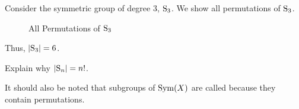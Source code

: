 \begin{example}\label{example-symmetric-group-of-degree-3}
    Consider the symmetric group of degree 3, $\mathrm{S}_{3}$. We show all permutations of $\mathrm{S}_{3}$.

    \begin{figure}[h]
        \centering
        \caption{All Permutations of $\mathrm{S}_{3}$}
    \end{figure}

    Thus, $|\mathrm{S}_{3}| = 6$.
\end{example}
\begin{exercise}\label{exercise-order-of-Sn}
    Explain why $|\mathrm{S}_{n}| = n!$.
\end{exercise}

It should also be noted that subgroups of $\mathrm{Sym}(X)$ are called  because they contain permutations.

